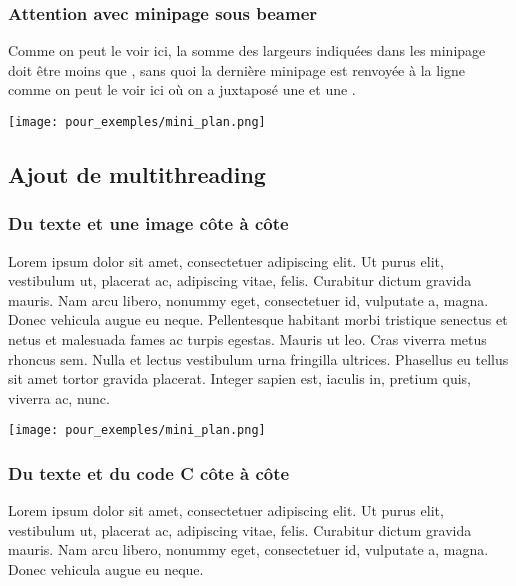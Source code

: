 \begin{frame}
  \frametitle{Attention avec minipage sous beamer}
  
  \begin{minipage}{0.6\textwidth}
  	Comme on peut le voir ici, la somme des largeurs indiquées dans les minipage doit être moins que  \lin{\textwidth}, sans quoi la dernière minipage est renvoyée à la ligne comme on peut le voir ici où on a juxtaposé une  et une .
  \end{minipage}
  \begin{minipage}{0.4\textwidth}
    \texttt{[image: pour\_exemples/mini\_plan.png]}
  \end{minipage}
\end{frame}


\subsection{Ajout de multithreading}
\begin{frame}
  \frametitle{Du texte et une image côte à côte}
  
  \begin{minipage}{0.56\textwidth}
    Lorem ipsum dolor sit amet, consectetuer adipiscing elit. 
    Ut purus elit, vestibulum ut, placerat ac, adipiscing vitae, felis. 
    Curabitur dictum gravida mauris. 
    Nam arcu libero, nonummy eget, consectetuer id, vulputate a, magna. 
    Donec vehicula augue eu neque. 
    Pellentesque habitant morbi tristique senectus et netus et malesuada fames ac turpis egestas. 
    Mauris ut leo. Cras viverra metus rhoncus sem. 
    Nulla et lectus vestibulum urna fringilla ultrices.
    Phasellus eu tellus sit amet tortor gravida placerat. Integer sapien est,
    iaculis in, pretium quis, viverra ac, nunc.
  \end{minipage}
  \hfill
  \begin{minipage}{0.38\textwidth}
    \texttt{[image: pour\_exemples/mini\_plan.png]}
  \end{minipage}
\end{frame}

\begin{frame}
  \frametitle{Du texte et du code C côte à côte\esp}
  
  \begin{minipage}{0.4\textwidth}
    Lorem ipsum dolor sit amet, consectetuer adipiscing elit. 
    Ut purus elit, vestibulum ut, placerat ac, adipiscing vitae, felis. 
    Curabitur dictum gravida mauris. 
    Nam arcu libero, nonummy eget, consectetuer id, vulputate a, magna. 
    Donec vehicula augue eu neque. 
  \end{minipage}
  \begin{minipage}{0.58\textwidth}
    \inputminted[firstline=3, lastline=8,firstnumber=1]{c}{pour_exemples/main.c}
  \end{minipage}
\end{frame}


